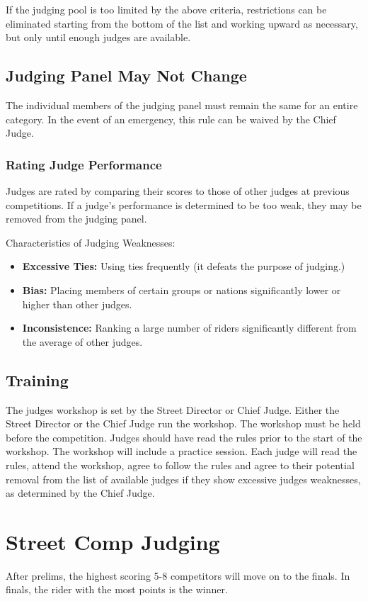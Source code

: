 If the judging pool is too limited by the above criteria, restrictions can be eliminated starting from the bottom of the list and working upward as necessary, but only until enough judges are available.

\subsection{Judging Panel May Not Change}

The individual members of the judging panel must remain the same for an entire category.
In the event of an emergency, this rule can be waived by the Chief Judge.

\subsubsection{Rating Judge Performance}
Judges are rated by comparing their scores to those of other judges at previous competitions.
If a judge's performance is determined to be too weak, they may be removed from the judging panel.

Characteristics of Judging Weaknesses:
\begin{itemize}
\item \textbf{Excessive Ties:}
Using ties frequently (it defeats the purpose of judging.)
\item \textbf{Bias:}
Placing members of certain groups or nations significantly lower or higher than other judges.
\item\textbf{Inconsistence:}
Ranking a large number of riders significantly different from the average of other judges.
\end{itemize}

\subsection{Training}
The judges workshop is set by the Street Director or Chief Judge.
Either the Street Director or the Chief Judge run the workshop.
The workshop must be held before the competition.
Judges should have read the rules prior to the start of the workshop.
The workshop will include a practice session.
Each judge will read the rules, attend the workshop, agree to follow the rules and agree to their potential removal from the list of available judges if they show excessive judges weaknesses, as determined by the Chief Judge.

\section{Street Comp Judging}
After prelims, the highest scoring 5-8 competitors will move on to the finals.
In finals, the rider with the most points is the winner.

